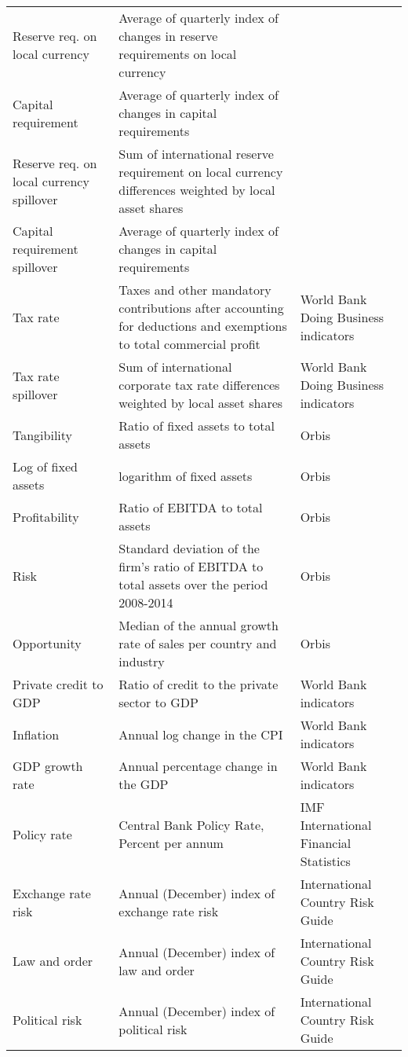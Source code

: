 \begin{longtable}{p{1.7in}p{2.6in}p{1.7in}}
			Reserve req. on local currency & Average of quarterly index of changes in reserve requirements on local currency & \cite{cerutti2017changes}\\
			Capital requirement & Average of quarterly index of changes in capital requirements & \cite{cerutti2017changes}\\
			Reserve req. on local currency spillover & Sum of international reserve requirement on local currency differences weighted by local asset shares& \cite{cerutti2017changes}\\
			Capital requirement spillover & Average of quarterly index of changes in capital requirements  & \cite{cerutti2017changes}\\
			Tax rate & Taxes and other mandatory contributions after accounting  for deductions and exemptions to total commercial profit & World Bank Doing Business indicators\\
			Tax rate spillover & Sum of international corporate tax rate  differences weighted by local asset shares& World Bank Doing Business indicators\\
			Tangibility& Ratio of fixed assets to total assets & Orbis\\
			Log of fixed assets& logarithm of fixed assets & Orbis\\
			Profitability& Ratio of EBITDA to total assets & Orbis\\
			Risk & Standard deviation of the firm's ratio of EBITDA to total assets over the period 2008-2014& Orbis\\
			Opportunity & Median of the annual growth rate of sales per country and industry& Orbis\\
			Private credit to GDP & Ratio of credit to the private sector to GDP & World Bank indicators\\	
			Inflation & Annual log change in the CPI & World Bank indicators\\
			GDP growth rate &Annual percentage change in the GDP & World Bank indicators\\
			 Policy rate &Central Bank Policy Rate, Percent per annum & IMF International Financial Statistics \\
			Exchange rate risk &Annual (December) index of exchange rate risk &International Country Risk Guide\\
			Law and order &Annual (December) index of law and order &International Country Risk Guide\\
			Political risk &Annual (December) index of political risk &International Country Risk Guide\\
		\end{longtable}%
